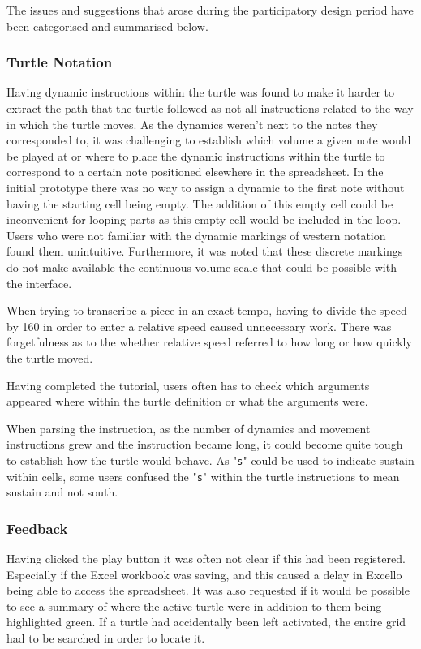 The issues and suggestions that arose during the participatory design period have been categorised and summarised below.

\subsubsection{Turtle Notation}

Having dynamic instructions within the turtle was found to make it harder to extract the path that the turtle followed as not all instructions related to the way in which the turtle moves. As the dynamics weren't next to the notes they corresponded to, it was challenging to establish which volume a given note would be played at or where to place the dynamic instructions within the turtle to correspond to a certain note positioned elsewhere in the spreadsheet. In the initial prototype there was no way to assign a dynamic to the first note without having the starting cell being empty. The addition of this empty cell could be inconvenient for looping parts as this empty cell would be included in the loop. Users who were not familiar with the dynamic markings of western notation found them unintuitive. Furthermore, it was noted that these discrete markings do not make available the continuous volume scale that could be possible with the interface.

When trying to transcribe a piece in an exact tempo, having to divide the speed by 160 in order to enter a relative speed caused unnecessary work. There was forgetfulness as to the whether relative speed referred to how long or how quickly the turtle moved.

Having completed the tutorial, users often has to check which arguments appeared where within the turtle definition or what the arguments were.

When parsing the instruction, as the number of dynamics and movement instructions grew and the instruction became long, it could become quite tough to establish how the turtle would behave. As "\texttt{s}" could be used to indicate sustain within cells, some users confused the "\texttt{s}" within the turtle instructions to mean sustain and not south.

\subsubsection{Feedback}

Having clicked the play button it was often not clear if this had been registered. Especially if the Excel workbook was saving, and this caused a delay in Excello being able to access the spreadsheet. It was also requested if it would be possible to see a summary of where the active turtle were in addition to them being highlighted green. If a turtle had accidentally been left activated, the entire grid had to be searched in order to locate it.


